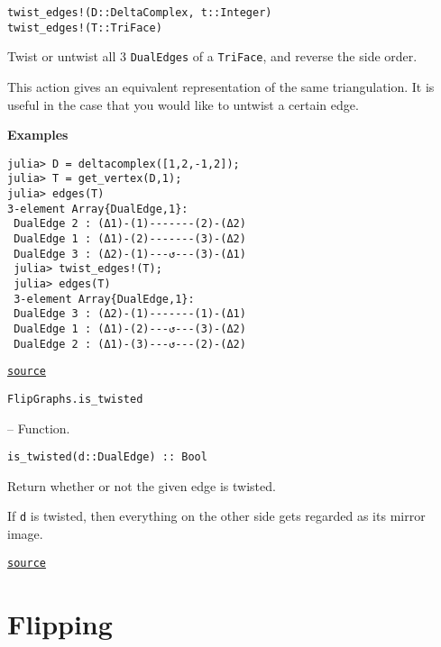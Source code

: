 \begin{adjustwidth}{2em}{0pt}


\begin{verbatim}
twist_edges!(D::DeltaComplex, t::Integer)
twist_edges!(T::TriFace)
\end{verbatim}

Twist or untwist all 3 \texttt{DualEdges} of a \texttt{TriFace}, and reverse the side order.

This action gives an equivalent representation of the same triangulation. It is useful in the case that you would like to untwist a certain edge.

\textbf{Examples}


\begin{verbatim}
julia> D = deltacomplex([1,2,-1,2]);
julia> T = get_vertex(D,1);
julia> edges(T)
3-element Array{DualEdge,1}:
 DualEdge 2 : (Δ1)-(1)-------(2)-(Δ2)
 DualEdge 1 : (Δ1)-(2)-------(3)-(Δ2)
 DualEdge 3 : (Δ2)-(1)---↺---(3)-(Δ1)
 julia> twist_edges!(T);
 julia> edges(T)
 3-element Array{DualEdge,1}:
 DualEdge 3 : (Δ2)-(1)-------(1)-(Δ1)
 DualEdge 1 : (Δ1)-(2)---↺---(3)-(Δ2)
 DualEdge 2 : (Δ1)-(3)---↺---(2)-(Δ2)
\end{verbatim}



\href{https://github.com/schto223/FlipGraphs.jl/blob/e35d43698a06b86273148826b79d585ba04fcd26/src/deltaComplex.jl#L801-L826}{\texttt{source}}


\end{adjustwidth}
\hypertarget{5140467616149147479}{\texttt{FlipGraphs.is\_twisted}}  -- {Function.}

\begin{adjustwidth}{2em}{0pt}


\begin{verbatim}
is_twisted(d::DualEdge) :: Bool
\end{verbatim}

Return whether or not the given edge is twisted. 

If \texttt{d} is twisted, then everything on the other side gets regarded as its mirror image. 



\href{https://github.com/schto223/FlipGraphs.jl/blob/e35d43698a06b86273148826b79d585ba04fcd26/src/deltaComplex.jl#L125-L131}{\texttt{source}}


\end{adjustwidth}

\section{Flipping}



